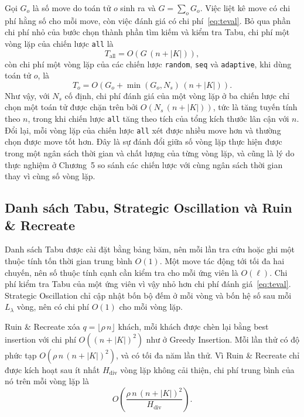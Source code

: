 \documentclass[../DoAn.tex]{subfiles}
\begin{document}
Gọi $G_o$ là số move do toán tử $o$ sinh ra và $G = \sum_o G_o$. Việc liệt kê move có chi phí hằng số cho mỗi move, còn việc đánh giá có chi phí~\eqref{eq:teval}. Bỏ qua phần chi phí nhỏ của bước chọn thành phần tìm kiếm và kiểm tra Tabu, chi phí một vòng lặp của chiến lược \texttt{all} là
\begin{equation}
T_{\text{all}} = O\!\left(G\,(n + |K|)\right),
\end{equation}
còn chi phí một vòng lặp của các chiến lược \texttt{random}, \texttt{seq} và \texttt{adaptive}, khi dùng toán tử $o$, là
\begin{equation}
T_{o} = O\!\left(G_o + \min(G_o, N_s)\,(n + |K|)\right).
\end{equation}
Như vậy, với $N_s$ cố định, chi phí đánh giá của một vòng lặp ở ba chiến lược chỉ chọn một toán tử được chặn trên bởi $O(N_s\,(n + |K|))$, tức là tăng tuyến tính theo $n$, trong khi chiến lược \texttt{all} tăng theo tích của tổng kích thước lân cận với $n$. Đổi lại, mỗi vòng lặp của chiến lược \texttt{all} xét được nhiều move hơn và thường chọn được move tốt hơn. Đây là sự đánh đổi giữa số vòng lặp thực hiện được trong một ngân sách thời gian và chất lượng của từng vòng lặp, và cũng là lý do thực nghiệm ở Chương~5 so sánh các chiến lược với cùng ngân sách thời gian thay vì cùng số vòng lặp.

\subsection{Danh sách Tabu, Strategic Oscillation và Ruin \& Recreate}

Danh sách Tabu được cài đặt bằng bảng băm, nên mỗi lần tra cứu hoặc ghi một thuộc tính tốn thời gian trung bình $O(1)$. Một move tác động tới tối đa hai chuyến, nên số thuộc tính cạnh cần kiểm tra cho mỗi ứng viên là $O(\ell)$. Chi phí kiểm tra Tabu của một ứng viên vì vậy nhỏ hơn chi phí đánh giá~\eqref{eq:teval}. Strategic Oscillation chỉ cập nhật bốn bộ đếm ở mỗi vòng và bốn hệ số sau mỗi $L_\lambda$ vòng, nên có chi phí $O(1)$ cho mỗi vòng lặp.

Ruin \& Recreate xóa $q = \lfloor \rho\, n \rfloor$ khách, mỗi khách được chèn lại bằng best insertion với chi phí $O((n + |K|)^2)$ như ở Greedy Insertion. Mỗi lần thử có độ phức tạp $O(\rho\, n\,(n + |K|)^2)$, và có tối đa năm lần thử. Vì Ruin \& Recreate chỉ được kích hoạt sau ít nhất $H_{\text{div}}$ vòng lặp không cải thiện, chi phí trung bình của nó trên mỗi vòng lặp là
\begin{equation}
O\!\left(\frac{\rho\, n\,(n + |K|)^2}{H_{\text{div}}}\right).
\end{equation}
\end{document}
